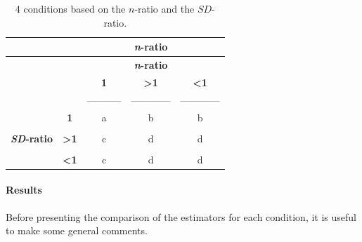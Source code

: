 \documentclass[
  english,
  man,floatsintext]{apa6}
\let\oldparagraph\paragraph
\renewcommand{\paragraph}[1]{\oldparagraph{#1}\mbox{}}
\begin{document}
\newpage

\begin{longtable}[]{@{}ccccc@{}}
\caption{4 conditions based on the \(n\)-ratio and the \(SD\)-ratio.}\tabularnewline
\toprule
& & & \textbf{\emph{n}-ratio} & \\
\midrule
\endfirsthead
\toprule
& & & \textbf{\emph{n}-ratio} & \\
\midrule
\endhead
& & \textbf{1} & \textbf{\textgreater1} & \textbf{\textless1} \\
& & ----------- & ------------ & ------------ \\
& \textbf{1} & a & b & b \\
& & & & \\
\textbf{\emph{SD}-ratio} & \textbf{\textgreater1} & c & d & d \\
& & & & \\
& \textbf{\textless1} & c & d & d \\
\bottomrule
\end{longtable}

\hypertarget{results}{%
\paragraph{Results}\label{results}}

Before presenting the comparison of the estimators for each condition, it is useful to make some general comments.
\end{document}

